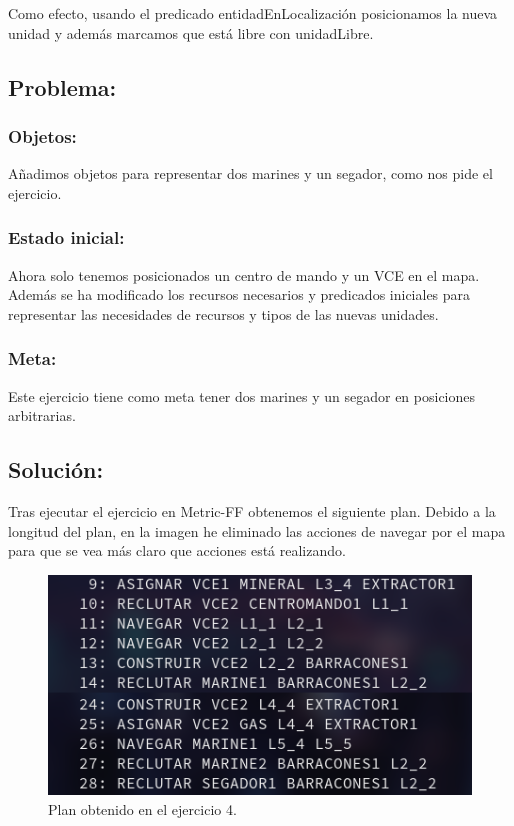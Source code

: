 \documentclass[10pt, spanish]{article}
\begin{document}
Como efecto, usando el predicado entidadEnLocalización posicionamos la nueva unidad y además marcamos que está libre con unidadLibre.


\subsection{Problema:}

\subsubsection{Objetos:}

Añadimos objetos para representar dos marines y un segador, como nos pide el ejercicio.

\subsubsection{Estado inicial:}

Ahora solo tenemos posicionados un centro de mando y un VCE en el mapa. Además se ha modificado los recursos necesarios y predicados iniciales para representar las necesidades de recursos y tipos de las nuevas unidades.

\subsubsection{Meta:}

Este ejercicio tiene como meta tener dos marines y un segador en posiciones arbitrarias.

\subsection{Solución:}

\begin{multicols}{2}

Tras ejecutar el ejercicio en Metric-FF obtenemos el siguiente plan. Debido a la longitud del plan, en la imagen he eliminado las acciones de navegar por el mapa para que se vea más claro que acciones está realizando.

\begin{figure}[H]
	\centering
	\includegraphics[scale=0.3]{plan4.png}
	\caption{Plan obtenido en el ejercicio 4.}
	\label{plan4}
\end{figure}

\end{multicols}
\end{document}
